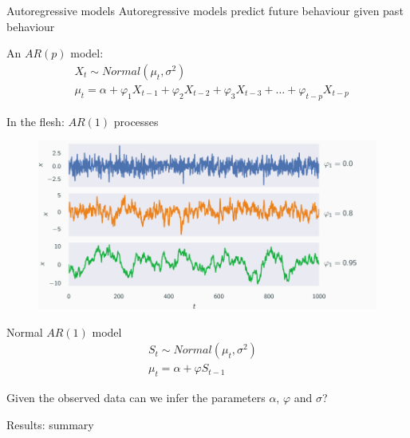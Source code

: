 \documentclass[aspectratio=169]{beamer}
\begin{document}
\begin{frame}{Autoregressive models}
  Autoregressive models \alert{predict future} behaviour \alert{given past} behaviour

  An $AR(p)$ model:
  \begin{align*}
      & X_{t} \sim Normal(\mu_{t}, \sigma^2) \\
      &  \mu_{t} = \alpha + \varphi_1 X_{t-1} + \varphi_2 X_{t-2} + \varphi_3 X_{t-3} + \ldots +
      \varphi_{t-p} X_{t-p}
  \end{align*}
\end{frame}

\begin{frame}{In the flesh: $AR(1)$ processes}
  \vspace{-0.85cm}
  \begin{figure}
    \includegraphics{AR.pdf}
  \end{figure}
\end{frame}

\begin{frame}{Normal $AR(1)$ model}
  \begin{align*}
      S_t \sim Normal(\mu_t, \sigma^2) & \\
      \mu_t = \alpha + \varphi S_{t-1} &
  \end{align*}

  Given the observed data can we infer the parameters $\alpha$,
  $\varphi$ and $\sigma$?
\end{frame}

\begin{frame}{Results: summary}
  \centering
  \begin{table}
    
    \caption{Summary of posterior samples after running Stan for $10\,000$ iterations (3 seconds).}
  \end{table}
\end{frame}
\end{document}
